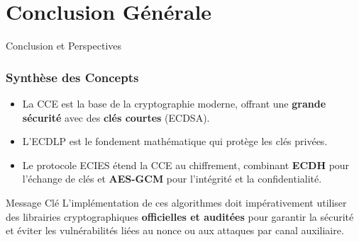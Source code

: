 \documentclass[aspectratio=169]{beamer}
\begin{document}
\section{Conclusion Générale}
\begin{frame}{Conclusion et Perspectives}
\frametitle{Synthèse des Concepts}

\begin{itemize}
    \item La CCE est la base de la cryptographie moderne, offrant une \textbf{grande sécurité} avec des \textbf{clés courtes} (ECDSA).
    \item L'ECDLP est le fondement mathématique qui protège les clés privées.
    \item Le protocole ECIES étend la CCE au chiffrement, combinant \textbf{ECDH} pour l'échange de clés et \textbf{AES-GCM} pour l'intégrité et la confidentialité.
\end{itemize}

\begin{alertblock}{Message Clé}
    L'implémentation de ces algorithmes doit impérativement utiliser des librairies cryptographiques \textbf{officielles et auditées} pour garantir la sécurité et éviter les vulnérabilités liées au nonce ou aux attaques par canal auxiliaire.
\end{alertblock}
\end{frame}
\end{document}

